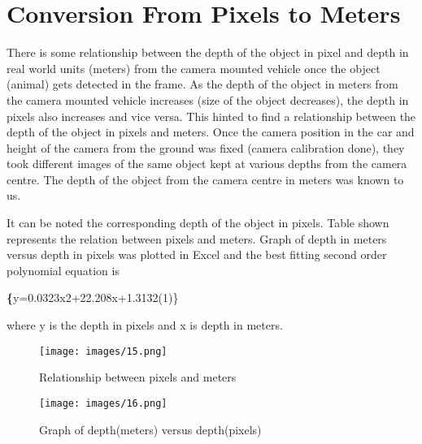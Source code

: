 \documentclass[14pt,a4paper,final]{extreport}
\begin{document}
\chapter{Conversion From Pixels to Meters}
\item There is some relationship between the depth of the object in pixel and depth in real world units (meters) from the camera mounted vehicle once the object (animal) gets detected in the frame. As the depth of the object in meters from the camera mounted vehicle increases (size of the object decreases), the depth in pixels also increases and vice versa. This hinted to find a relationship between the depth of the object in pixels and meters. Once the camera position in the car and height of the camera from the ground was fixed (camera calibration done), they took different images of the same object kept at various depths from the camera centre. The depth of the object from the camera centre in meters was known to us.
\item It can be noted the corresponding depth of the object in pixels. Table shown represents the relation between pixels and meters. Graph of depth in meters versus depth in pixels was plotted in Excel  and the best fitting second order polynomial equation is
\newline\item \textbf \{y=0.0323x2+22.208x+1.3132(1)\}
\newline \item where y is the depth in pixels and x is depth in meters.
\newline
\newline

\begin{figure}[h]
	\begin{center}
		\texttt{[image: images/15.png]}
		\vspace{.1 cm}
		\caption[Relationship between pixels and meters]{Relationship between pixels and meters}
	\end{center}
\end{figure}

\begin{figure}[h]
	\begin{center}
		\texttt{[image: images/16.png]}
		\vspace{.1 cm}
		\caption[Graph of depth(meters) versus depth(pixels)]{Graph of depth(meters) versus depth(pixels)}
	\end{center}
\end{figure}
\end{document}
